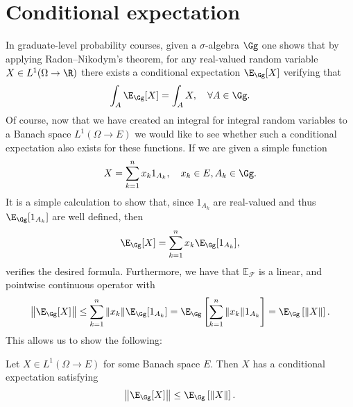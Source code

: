 \documentclass[
    a4paper,
    DIV=14,
    abstract=true,
    numbers=noenddot
]{scrartcl}
\begin{document}
\section{Conditional expectation}
In graduate-level probability courses, given a $\sigma$-algebra $\Gg$ one shows that by applying Radon--Nikodym's theorem, for any real-valued random variable $X\in L^1(\Omega\to \R)$ there exists a conditional expectation $\E_{\Gg}[X]$ verifying that
\begin{equation*}
	\int_A \E_{\Gg}[X]=\int_A X,\quad \forall A\in\Gg.
\end{equation*}
Of course, now that we have created an integral for integral random variables to a Banach space $L^1(\Omega\to E)$ we would like to see whether such a conditional expectation also exists for these functions. If we are given a simple function
\begin{equation*}
	X=\sum_{k=1}^n x_k 1_{A_k}, \quad x_k\in E, A_k\in\Gg.
\end{equation*}
It is a simple calculation to show that, since $1_{A_k}$ are real-valued and thus $\E_{\Gg}[1_{A_k}]$ are well defined, then
\begin{equation*}
	\E_{\Gg}[X]=\sum_{k=1}^n x_k \E_{\Gg}[1_{A_k}],
\end{equation*}
verifies the desired formula. Furthermore, we have that $\mathbb{E}_\mathcal{F}$ is a linear, and pointwise continuous operator with
\begin{equation*}
	\left\|\E_{\Gg}[X]\right\|\leq \sum_{k=1}^n \|x_k\| \E_{\Gg}[1_{A_k}]=\E_{\Gg}\left[\sum_{k=1}^n \|x_k\|1_{A_k}\right]=\E_{\Gg}\left[\|X\|\right].
\end{equation*}
This allows us to show the following:
\begin{theorem}
	Let $X\in L^1(\Omega\to E)$ for some Banach space $E$. Then $X$ has a conditional expectation satisfying
	\begin{equation*}
		\left\|\E_{\Gg}[X]\right\|\leq\E_{\Gg}\left[\|X\|\right].
	\end{equation*}
\end{theorem}
\end{document}
